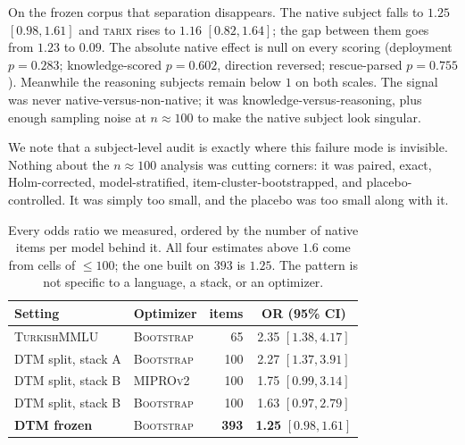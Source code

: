 \documentclass[11pt]{article}
\newcommand{\tarix}{\textsc{tarix}}
\newcommand{\bsfs}{\textsc{BootstrapFewShot}}
\newcommand{\bsfsS}{\textsc{Bootstrap}}   %
\begin{document}
On the frozen corpus that separation disappears. The native subject falls to $1.25$
$[0.98, 1.61]$ and \tarix{} rises to $1.16$ $[0.82, 1.64]$; the gap between them goes
from $1.23$ to $0.09$. The absolute native effect is null on every scoring (deployment
$p{=}0.283$; knowledge-scored $p{=}0.602$, direction reversed; rescue-parsed
$p{=}0.755$). Meanwhile the reasoning subjects remain below $1$ on both scales. The
signal was never native-versus-non-native; it was knowledge-versus-reasoning, plus
enough sampling noise at $n{\approx}100$ to make the native subject look singular.

We note that a subject-level audit is exactly where this failure mode is invisible.
Nothing about the $n{\approx}100$ analysis was cutting corners: it was paired, exact,
Holm-corrected, model-stratified, item-cluster-bootstrapped, and placebo-controlled. It
was simply too small, and the placebo was too small along with it.

\begin{table}[t]\centering\small
\caption{Every odds ratio we measured, ordered by the number of native items per model
behind it. All four estimates above $1.6$ come from cells of ${\le}100$; the one built on
$393$ is $1.25$. The pattern is not specific to a language, a stack, or an optimizer.}
\label{tab:allors}
\setlength{\tabcolsep}{2pt}
\begin{tabular}{llrc}
\toprule
Setting & Optimizer & items & OR (95\% CI) \\
\midrule
\textsc{TurkishMMLU}   & \bsfsS{}    & \phantom{0}65 & 2.35 $[1.38, 4.17]$ \\
DTM split, stack A     & \bsfsS{}    & 100 & 2.27 $[1.37, 3.91]$ \\
DTM split, stack B     & \textsc{MIPROv2} & 100 & 1.75 $[0.99, 3.14]$ \\
DTM split, stack B     & \bsfsS{}    & 100 & 1.63 $[0.97, 2.79]$ \\
\midrule
\textbf{DTM frozen} & \bsfsS{} & \textbf{393} & \textbf{1.25} $[0.98, 1.61]$ \\
\bottomrule
\end{tabular}
\end{table}
\end{document}
